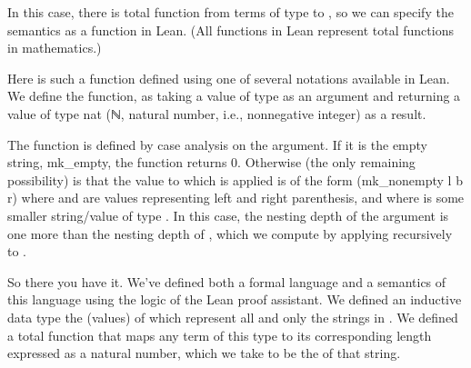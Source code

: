 \documentclass[letterpaper,10pt,english]{sphinxmanual}
\begin{document}
\sphinxAtStartPar
In this case, there is total function from terms of type
 to , so we can specify the semantics as a function
in Lean. (All functions in Lean represent total functions in
mathematics.)

\sphinxAtStartPar
Here is such a function defined using one of several notations
available in Lean. We define the function,  as taking a
value of type  as an argument and returning a value of
type nat (ℕ, natural number, i.e., non\sphinxhyphen{}negative integer) as
a result.

\sphinxAtStartPar
The function is defined by case analysis on the argument. If
it is the empty string, mk\_empty, the function returns 0.
Otherwise (the only remaining possibility) is that the value
to which  is applied is of the form (mk\_nonempty l b r)
where  and  are values representing left and right
parenthesis, and where  is some smaller string/value of
type . In this case, the nesting depth of the argument
is one more than the nesting depth of , which we compute
by applying  recursively to .

\begin{sphinxVerbatim}[commandchars=\\\{\}]
     
   
         

  
  
  
\end{sphinxVerbatim}

\sphinxAtStartPar
So there you have it. We’ve defined both a formal language
and a semantics of this language using the logic of the Lean
proof assistant. We defined an inductive data type the 
(values) of which represent all and only the strings in .
We defined a total function that maps any term of this type to
its corresponding length expressed as a natural number, which
we take to be the  of that string.
\end{document}
